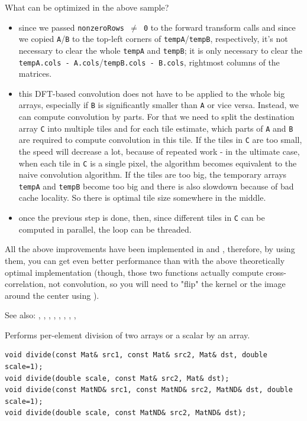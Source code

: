 What can be optimized in the above sample?
\begin{itemize}
    \item since we passed \texttt{nonzeroRows $\ne$ 0} to the forward transform calls and
    since we copied \texttt{A}/\texttt{B} to the top-left corners of \texttt{tempA}/\texttt{tempB}, respectively,
    it's not necessary to clear the whole \texttt{tempA} and \texttt{tempB};
    it is only necessary to clear the \texttt{tempA.cols - A.cols}/\texttt{tempB.cols - B.cols},
    rightmost columns of the matrices.
    \item this DFT-based convolution does not have to be applied to the whole big arrays,
    especially if \texttt{B} is significantly smaller than \texttt{A} or vice versa.
    Instead, we can compute convolution by parts. For that we need to split the destination array
    \texttt{C} into multiple tiles and for each tile estimate, which parts of \texttt{A} and \texttt{B}
    are required to compute convolution in this tile. If the tiles in \texttt{C} are too small,
    the speed will decrease a lot, because of repeated work - in the ultimate case, when each tile in \texttt{C} is a single pixel,
    the algorithm becomes equivalent to the naive convolution algorithm.
    If the tiles are too big, the temporary arrays \texttt{tempA} and \texttt{tempB} become too big
    and there is also slowdown because of bad cache locality. So there is optimal tile size somewhere in the middle.
    \item once the previous step is done, then, since different tiles in \texttt{C} can be computed in parallel, the loop can be threaded.
\end{itemize}

All the above improvements have been implemented in  and , therefore, by using them, you can get even better performance than with the above theoretically optimal implementation (though, those two functions actually compute cross-correlation, not convolution, so you will need to "flip" the kernel or the image around the center using ).

See also: , , , , , , , , 

\label{divide}

Performs per-element division of two arrays or a scalar by an array.

\begin{lstlisting}
void divide(const Mat& src1, const Mat& src2, Mat& dst, double scale=1);
void divide(double scale, const Mat& src2, Mat& dst);
void divide(const MatND& src1, const MatND& src2, MatND& dst, double scale=1);
void divide(double scale, const MatND& src2, MatND& dst);
\end{lstlisting}
\begin{description}
\end{description}


